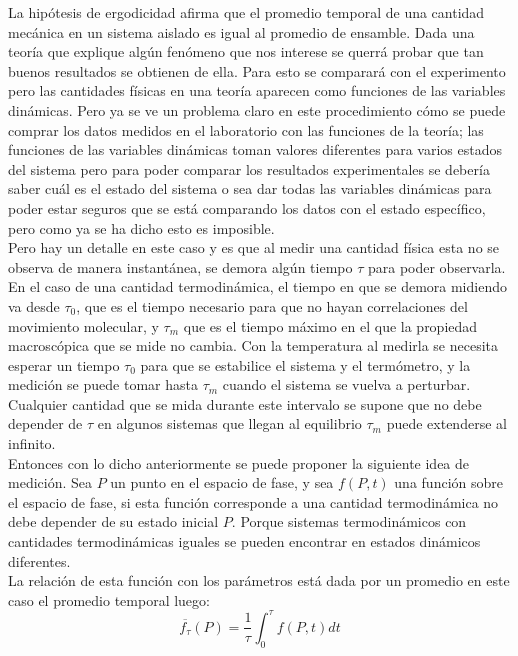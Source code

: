 La hipótesis de ergodicidad afirma que el promedio temporal de una cantidad mecánica en un sistema aislado es igual al promedio de ensamble. Dada una teoría que explique algún fenómeno que nos interese se querrá probar que tan buenos resultados se obtienen de ella. Para esto se comparará con el experimento pero las cantidades físicas en una teoría aparecen como funciones de las variables dinámicas. Pero ya se ve un problema claro en este procedimiento cómo se puede comprar los datos medidos en el laboratorio con las funciones de la teoría; las funciones de las variables dinámicas toman valores diferentes para varios estados del sistema pero para poder comparar los resultados experimentales se debería saber cuál es el estado del sistema o sea dar todas las variables dinámicas para poder estar seguros que se está comparando los datos con el estado específico, pero como ya se ha dicho esto es imposible.
\\
Pero hay un detalle en este caso y es que al medir una cantidad física esta no se observa de manera instantánea, se demora algún tiempo $\tau$ para poder observarla. En el caso de una cantidad termodinámica, el tiempo en que se demora midiendo va desde $\tau_{0}$, que es el tiempo necesario para que no hayan correlaciones del movimiento molecular, y  $\tau_{m}$ que es el tiempo máximo en el que la propiedad macroscópica que se mide no cambia. Con la temperatura al medirla se necesita esperar un tiempo $\tau_{0}$ para que se estabilice el sistema y el termómetro, y la medición se puede tomar hasta $\tau_{m}$ cuando el sistema se vuelva a perturbar. Cualquier cantidad que se mida durante este intervalo se supone que no debe depender de $\tau$ en algunos sistemas que llegan al equilibrio $\tau_{m}$ puede extenderse al infinito.
\\
Entonces con lo dicho anteriormente se puede proponer la siguiente idea de medición. Sea $P$ un punto en el espacio de fase, y sea $f(P,t)$ una función sobre el espacio de fase, si esta función corresponde a una cantidad termodinámica no debe depender de su estado inicial $P$. Porque sistemas termodinámicos con cantidades termodinámicas iguales se pueden encontrar en estados dinámicos diferentes. \\
La relación de esta función con los parámetros está dada por un promedio en este caso el promedio temporal luego:
\begin{equation}
\overline{f_{\tau}}(P)= \frac{1}{\tau} \int_{0}^{\tau} f(P,t) dt
\end{equation}
 
